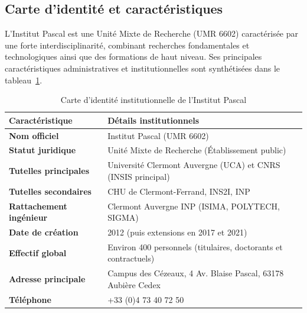 \documentclass[12pt,a4paper,oneside]{report}
\begin{document}
\subsection{Carte d'identité et caractéristiques}
L'Institut Pascal est une Unité Mixte de Recherche (UMR 6602) caractérisée par une forte interdisciplinarité, combinant recherches fondamentales et technologiques ainsi que des formations de haut niveau. Ses principales caractéristiques administratives et institutionnelles sont synthétisées dans le tableau~\ref{tab:carte_identite}.

\begin{table}[htbp]
    \centering
    \small
    \renewcommand{\arraystretch}{1.3}
    \begin{tabular}{|l|l|}
        \hline
        \textbf{Caractéristique} & \textbf{Détails institutionnels} \\
        \hline
        \textbf{Nom officiel} & Institut Pascal (UMR 6602) \\
        \hline
        \textbf{Statut juridique} & Unité Mixte de Recherche (Établissement public) \\
        \hline
        \textbf{Tutelles principales} & Université Clermont Auvergne (UCA) et CNRS (INSIS principal) \\
        \hline
        \textbf{Tutelles secondaires} & CHU de Clermont-Ferrand, INS2I, INP \\
        \hline
        \textbf{Rattachement ingénieur} & Clermont Auvergne INP (ISIMA, POLYTECH, SIGMA) \\
        \hline
        \textbf{Date de création} & 2012 (puis extensions en 2017 et 2021) \\
        \hline
        \textbf{Effectif global} & Environ 400 personnels (titulaires, doctorants et contractuels) \\
        \hline
        \textbf{Adresse principale} & Campus des Cézeaux, 4 Av. Blaise Pascal, 63178 Aubière Cedex \\
        \hline
        \textbf{Téléphone} & +33 (0)4 73 40 72 50 \\
        \hline
    \end{tabular}
    \caption{Carte d'identité institutionnelle de l'Institut Pascal}
    \label{tab:carte_identite}
\end{table}

\newpage
\end{document}
